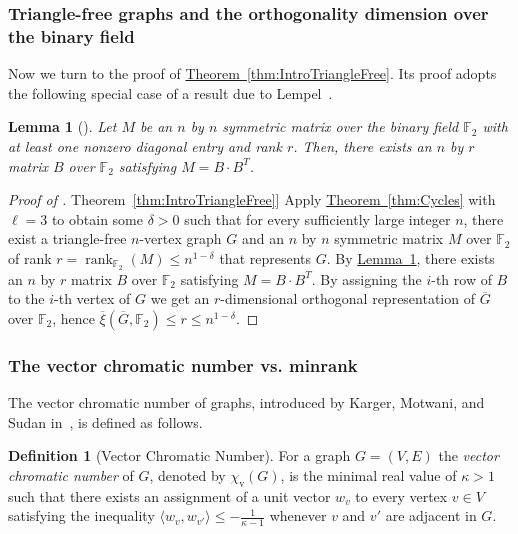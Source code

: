 \documentclass[11pt]{article}
\numberwithin{equation}{section}
\newtheorem{lemma}[theorem]{Lemma}
\theoremstyle{definition}
\newtheorem{definition}[theorem]{Definition}
\theoremstyle{plain}
\newcommand{\expref}[2]{\hyperref[#2]{#1~\ref{#2}}}
\newcommand{\Fset}{\mathbb{F}}
\newcommand{\od}{\overline{\xi}}
\newcommand{\rank}{\mathop{\mathrm{rank}}}
\newcommand{\vchrom}{{\chi_\mathrm{v}}}
\begin{document}
\subsubsection{Triangle-free graphs and the orthogonality dimension over the binary field}\label{sec:OD_F_2_triangle}

%
Now we turn to the proof of  %
\expref{Theorem}{thm:IntroTriangleFree}.
Its proof adopts the following special case of a result due to Lempel~\cite{Lempel75}.
\begin{lemma}[\cite{Lempel75}]\label{lem:lempel}
Let $M$ %
be  %
an $n$ by $n$ symmetric matrix over the binary field $\Fset_2$ with at least one nonzero diagonal entry and rank $r$. Then, there exists an $n$ by $r$ matrix $B$ over $\Fset_2$ satisfying $M = B \cdot B^T$.
\end{lemma}

\begin{proof}[Proof of \expref{Theorem}{thm:IntroTriangleFree}]
Apply \expref{Theorem}{thm:Cycles} with $\ell = 3$ to obtain some $\delta >0$ such that for every sufficiently large integer $n$, there exist a triangle-free $n$-vertex graph $G$ and an $n$ by $n$ symmetric matrix $M$ over $\Fset_2$ of rank $r = {\rank}_{\Fset_2}(M) \leq n^{1-\delta}$ that represents $G$.
By \expref{Lemma}{lem:lempel}, there exists an $n$ by $r$ matrix $B$ over $\Fset_2$ satisfying $M = B \cdot B^T$.
By assigning the $i$-th row of $B$ to the $i$-th vertex of $G$ we get an $r$-dimensional orthogonal representation of $\overline{G}$ over $\Fset_2$, hence $\od(\overline{G},\Fset_2) \leq r \leq n^{1-\delta}$.
\end{proof}

\subsubsection{The vector chromatic number vs. minrank}

The vector chromatic number of graphs, introduced by Karger, Motwani, and Sudan in~\cite{KargerMS98}, is defined as follows.

\begin{definition}[Vector Chromatic Number]\label{def:chi_v}
For a graph $G=(V,E)$ the \emph{vector chromatic number} of $G$,
denoted by $\vchrom(G)$, is the minimal real value of $\kappa > 1$ such
that there exists an assignment of a unit vector $w_v$ to every
vertex $v \in V$ satisfying the inequality $\langle w_{v}, w_{v'} \rangle \leq
-\frac{1}{\kappa -1}$ whenever $v$ and $v'$ are adjacent in $G$.
\end{definition}
\end{document}

